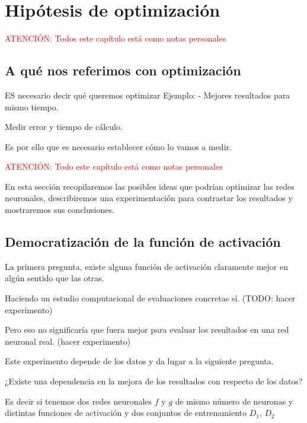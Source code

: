 %

\chapter{Hipótesis de optimización }
\textcolor{red}{ATENCIÓN: Todos este capítulo está como notas personales}

\section{A qué nos referimos con optimización}
ES necesario decir qué queremos optimizar
Ejemplo: 
- Mejores resultados para mismo tiempo. 

Medir error y tiempo de cálculo. 

Es por ello que es necesario establecer cómo lo vamos a medir.



\textcolor{red}{ATENCIÓN: Todo este capítulo está como notas personales}  


En esta sección recopilaremos las posibles ideas que podrían optimizar las 
redes neuronales, describiremos una experimentación para contrastar los resultados y mostraremos sus conclusiones. 

\section{Democratización de la función de activación}\label{hypothesis:activation-function}

La primera pregunta, existe alguna función de activación 
claramente mejor en algún sentido que las otras. 

Haciendo un estudio computacional de evaluaciones concretas sí. 
(TODO: hacer experimento)

Pero eso no significaría que fuera mejor para
evaluar los resultados en una red neuronal real. 
(hacer experimento)

Este experimento depende de los datos y da lugar a la siguiente pregunta. 

¿Existe una dependencia en la mejora de los resultados 
con respecto de los datos?

Es decir si tenemos dos redes neuronales $f$ y $g$  de mismo número de neuronas y distintas funciones de activación y dos conjuntos de entrenamiento $D_1$, $D_2$

